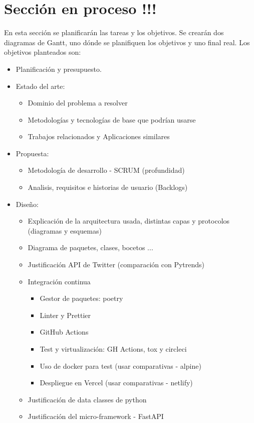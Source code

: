 \section{Sección en proceso !!!}
En esta sección se planificarán las tareas y los objetivos. Se crearán dos diagramas de Gantt, uno dónde se planifiquen los objetivos y uno final real. Los objetivos planteados son:
\begin{itemize}
\item Planificación y presupuesto.
\item Estado del arte:
\begin{itemize}
    \item Dominio del problema a resolver
    \item Metodologías y tecnologías de base que podrían usarse
    \item Trabajos relacionados y Aplicaciones similares
\end{itemize}
\item Propuesta:
\begin{itemize}
    \item Metodología de desarrollo - SCRUM (profundidad)
    \item Analisis, requisitos e historias de usuario (Backlogs)
\end{itemize}
\item Diseño:
\begin{itemize}
    \item Explicación de la arquitectura usada, distintas capas y protocolos (diagramas y esquemas)
    \item Diagrama de paquetes, clases, bocetos ...
    \item Justificación API de Twitter (comparación con Pytrends)
    \item Integración continua
    \begin{itemize}
        \item Gestor de paquetes: poetry
        \item Linter y Prettier
        \item GitHub Actions
        \item Test y virtualización: GH Actions, tox y circleci
        \item Uso de docker para test (usar comparativas - alpine)
        \item Despliegue en Vercel (usar comparativas - netlify)
    \end{itemize}
    \item Justificación de data classes de python
    \item Justificación del micro-framework - FastAPI

\end{itemize}
\end{itemize}
